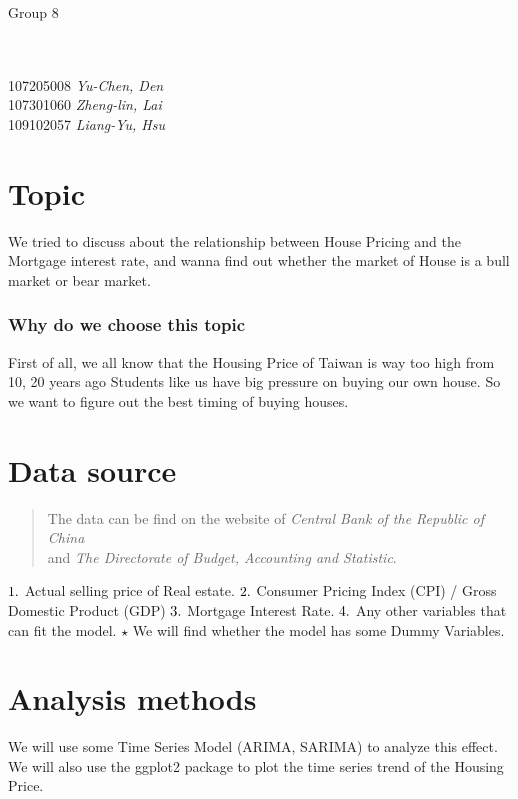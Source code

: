 \documentclass[12pt]{article}
\begin{document}
\rhead{\today}
\begin{large}
\hspace*{-5.8mm}Group 8
\end{large}\\\\
\hspace*{4mm} 107205008 \emph{Yu-Chen, Den}\\
\hspace*{4mm} 107301060 \emph{Zheng-lin, Lai}\\
\hspace*{4mm} 109102057 \emph{Liang-Yu, Hsu}
    \section*{Topic}
    We tried to discuss about the relationship between House Pricing and the Mortgage interest rate, 
    and wanna find out whether the market of House is a bull market or bear market.
        \subsubsection*{Why do we choose this topic}
        First of all, we all know that the Housing Price of Taiwan is way too high from 10, 20 years ago 
        Students like us have big pressure on buying our own house. So we want to figure out the best 
        timing of buying houses.
        
    \section*{Data source}
    \begin{quote}
        The data can be find on the website of \emph{Central Bank of the Republic of China} \\
        and \emph{The Directorate of Budget, Accounting and Statistic}.
    \end{quote}
    $\number 1.$ Actual selling price of Real estate.
    \newline
    $\number 2.$ Consumer Pricing Index (CPI) / Gross Domestic Product (GDP)
    \newline
    $\number 3.$ Mortgage Interest Rate.
    \newline
    $\number 4.$ Any other variables that can fit the model.
    \newline
    $\star$ We will find whether the model has some Dummy Variables.

    \section*{Analysis methods}
    We will use some Time Series Model (ARIMA, SARIMA) to analyze this effect. We will also use the ggplot2 package to plot the time series trend of the Housing Price.

       
\end{document}
